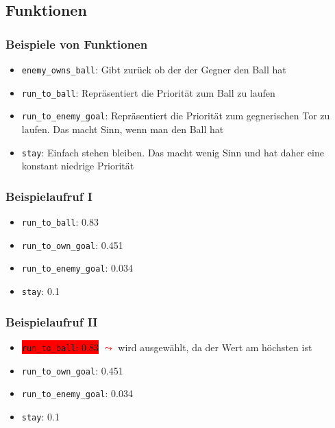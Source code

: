 \subsection{Funktionen}
\frame
{
  \frametitle{Beispiele von Funktionen}
  \begin{itemize}
    \item \texttt{enemy\_owns\_ball}: Gibt zurück ob der der Gegner den Ball hat
    \item \texttt{run\_to\_ball}: Repräsentiert die Priorität zum Ball zu laufen
    \item \texttt{run\_to\_enemy\_goal}: Repräsentiert die Priorität zum gegnerischen Tor zu laufen. Das macht Sinn, wenn man den Ball hat
    \item \texttt{stay}: Einfach stehen bleiben. Das macht wenig Sinn und hat daher eine konstant niedrige Priorität
   \end{itemize}
}
\frame
{
  \frametitle{Beispielaufruf I}
  \begin{itemize}
    \item \texttt{run\_to\_ball}: 0.83    
    \item \texttt{run\_to\_own\_goal}: 0.451
    \item \texttt{run\_to\_enemy\_goal}: 0.034
    \item \texttt{stay}: 0.1
  \end{itemize}
}

\frame
{
  \frametitle{Beispielaufruf II}
  \begin{itemize}
    \item \colorbox{red}{\texttt{run\_to\_ball}: 0.83} \textcolor{red}{$\leadsto$} wird ausgewählt, da der Wert am höchsten ist 
    \item \texttt{run\_to\_own\_goal}: 0.451
    \item \texttt{run\_to\_enemy\_goal}: 0.034
    \item \texttt{stay}: 0.1
  \end{itemize}
}